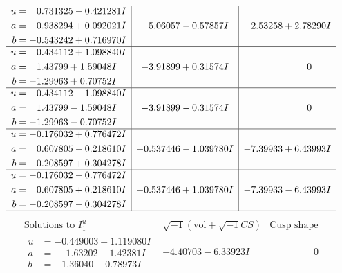 \documentclass[1p]{elsarticle_modified}
\theoremstyle{definition}
\newcommand{\I}{\sqrt{-1}}
\begin{document}
$$\begin{array}{c|c|c}
\begin{aligned}
u &= \phantom{-}0.731325 - 0.421281 I \\
a &= -0.938294 + 0.092021 I \\
b &= -0.543242 + 0.716970 I\end{aligned}
 & \phantom{-}5.06057 - 0.57857 I & \phantom{-}2.53258 + 2.78290 I \\ \hline\begin{aligned}
u &= \phantom{-}0.434112 + 1.098840 I \\
a &= \phantom{-}1.43799 + 1.59048 I \\
b &= -1.29963 + 0.70752 I\end{aligned}
 & -3.91899 + 0.31574 I & \phantom{-0.000000 } 0 \\ \hline\begin{aligned}
u &= \phantom{-}0.434112 - 1.098840 I \\
a &= \phantom{-}1.43799 - 1.59048 I \\
b &= -1.29963 - 0.70752 I\end{aligned}
 & -3.91899 - 0.31574 I & \phantom{-0.000000 } 0 \\ \hline\begin{aligned}
u &= -0.176032 + 0.776472 I \\
a &= \phantom{-}0.607805 - 0.218610 I \\
b &= -0.208597 + 0.304278 I\end{aligned}
 & -0.537446 - 1.039780 I & -7.39933 + 6.43993 I \\ \hline\begin{aligned}
u &= -0.176032 - 0.776472 I \\
a &= \phantom{-}0.607805 + 0.218610 I \\
b &= -0.208597 - 0.304278 I\end{aligned}
 & -0.537446 + 1.039780 I & -7.39933 - 6.43993 I\\
 \hline 
 \end{array}$$\newpage$$\begin{array}{c|c|c}  
\text{Solutions to }I^u_{1}& \I (\text{vol} + \sqrt{-1}CS) & \text{Cusp shape}\\
 \hline 
\begin{aligned}
u &= -0.449003 + 1.119080 I \\
a &= \phantom{-}1.63202 - 1.42381 I \\
b &= -1.36040 - 0.78973 I\end{aligned}
 & -4.40703 - 6.33923 I & \phantom{-0.000000 } 0 \\ \hline\begin{aligned}

\end{aligned}
\end{array}$$
\end{document}
